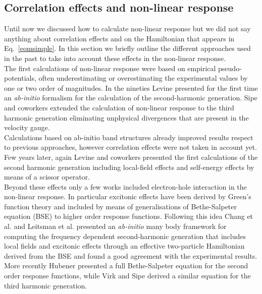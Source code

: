 \subsection{Correlation effects and non-linear response}
Until now we discussed how to calculate non-linear response but we did not say anything about correlation effects and on the Hamiltonian that appears in Eq.~\ref{eomsimple}. In this section we  briefly outline the different approaches used in the past to take into account these effects in the non-linear response.\\
The first calculations of non-linear response were based on empirical pseudo-potentials, often underestimating or overestimating the experimental values by one or two order of magnitudes.\cite{PhysRevB.12.2325,PhysRevB.36.9708}
In the nineties Levine\cite{PhysRevB.42.3567} presented for the first time an \emph{ab-initio} formalism for the calculation of the second-harmonic generation. Sipe and coworkers extended the calculation of non-linear response to the third harmonic generation eliminating  unphysical divergences that are present in the velocity gauge.\cite{PhysRevB.61.5337,PhysRevB.48.11705}\\ 
Calculations based on ab-initio band structures already improved results respect to previous approaches, however correlation effects were not taken in account yet. Few years later, again Levine and coworkers presented the first calculations of the second harmonic generation including local-field effects and self-energy effects by means of a scissor operator.\cite{PhysRevLett.63.1719,PhysRevB.56.1787} \\
Beyond these effects only a few works included electron-hole interaction in the non-linear response. In particular excitonic effects have been derived by Green's function theory and included by means of generalisations of Bethe-Salpeter equation (BSE)\cite{strinati} to higher order response functions. Following this idea Chang et al.\cite{Chang2002}  and Leitsman et al.\cite{Leitsmann2005} presented an \emph{ab-initio} many body framework for computing the frequency dependent second-harmonic generation that includes local fields and excitonic effects through an effective two-particle Hamiltonian derived from the BSE and found a good agreement with the experimental results.\\
More recently Hubener\cite{PhysRevA.83.062122} presented a full Bethe-Salpeter equation for the second order response functions, while Virk and Sipe derived a similar equation for the third harmonic generation.\cite{PhysRevB.56.1787}\\
